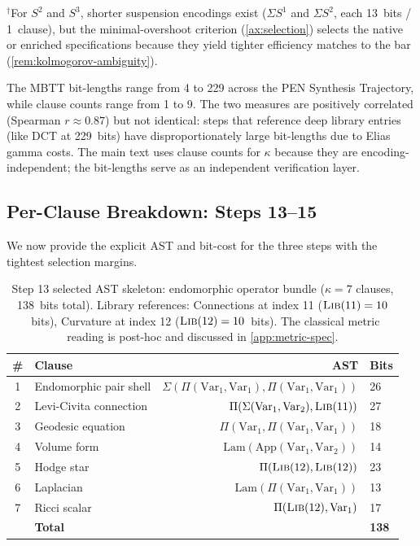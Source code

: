 \documentclass[11pt,a4paper]{article}
\theoremstyle{plain}
\theoremstyle{definition}
\theoremstyle{remark}
\begin{document}
\noindent ${}^\dagger$For $S^2$ and $S^3$, shorter suspension encodings exist ($\Sigma S^1$ and $\Sigma S^2$, each 13~bits / 1~clause), but the minimal-overshoot criterion (\cref{ax:selection}) selects the native or enriched specifications because they yield tighter efficiency matches to the bar (\cref{rem:kolmogorov-ambiguity}).

\medskip
\noindent The MBTT bit-lengths range from 4 to 229 across the PEN Synthesis Trajectory, while clause counts range from 1 to 9.
The two measures are positively correlated (Spearman $r \approx 0.87$) but not identical: steps that reference deep library entries (like DCT at 229~bits) have disproportionately large bit-lengths due to Elias gamma costs.
The main text uses clause counts for $\kappa$ because they are encoding-independent; the bit-lengths serve as an independent verification layer.

\subsection{Per-Clause Breakdown: Steps 13--15}

We now provide the explicit AST and bit-cost for the three steps with the tightest selection margins.

\begin{table}[tbp]
\centering
\caption{Step 13 selected AST skeleton: endomorphic operator bundle ($\kappa = 7$ clauses, 138~bits total).  Library references: Connections at index 11 ($\textsc{Lib}(11) = 10$~bits), Curvature at index 12 ($\textsc{Lib}(12) = 10$~bits).  The classical metric reading is post-hoc and discussed in \cref{app:metric-spec}.}
\label{tab:step13}
\small
\begin{tabular}{@{}clrl@{}}
\toprule
\# & Clause & AST & Bits \\
\midrule
1 & Endomorphic pair shell           & $\Sigma(\Pi(\mathrm{Var}_1, \mathrm{Var}_1), \Pi(\mathrm{Var}_1, \mathrm{Var}_1))$ & 26 \\
2 & Levi-Civita connection           & $\Pi(\Sigma(\mathrm{Var}_1, \mathrm{Var}_2), \textsc{Lib}(11))$ & 27 \\
3 & Geodesic equation                & $\Pi(\mathrm{Var}_1, \Pi(\mathrm{Var}_1, \mathrm{Var}_1))$ & 18 \\
4 & Volume form                      & $\mathrm{Lam}(\mathrm{App}(\mathrm{Var}_1, \mathrm{Var}_2))$ & 14 \\
5 & Hodge star                       & $\Pi(\textsc{Lib}(12), \textsc{Lib}(12))$ & 23 \\
6 & Laplacian                        & $\mathrm{Lam}(\Pi(\mathrm{Var}_1, \mathrm{Var}_1))$ & 13 \\
7 & Ricci scalar                     & $\Pi(\textsc{Lib}(12), \mathrm{Var}_1)$ & 17 \\
\midrule
  & \textbf{Total} & & \textbf{138} \\
\bottomrule
\end{tabular}
\end{table}
\end{document}
